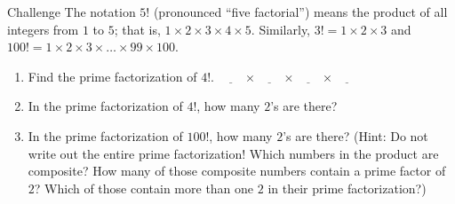 \documentclass[12pt,letterpaper]{article}
\begin{document}
\begin{problem}{Challenge}
The notation $5!$ (pronounced ``five factorial'') means
the product of all integers from $1$ to $5$; that is,
$1 \times 2 \times 3 \times 4 \times 5$. Similarly,
$3! = 1 \times 2 \times 3$ and $100! = 1 \times 2 \times
3 \times\ldots\times 99 \times 100$.

\begin{enumerate}
 \item Find the prime factorization of $4!$. \hfill
 $\underline{\hspace{2em}} \times
  \underline{\hspace{2em}} \times \underline{\hspace{2em}}
  \times \underline{\hspace{2em}}$
 \item In the prime factorization of $4!$, how many $2$'s are there?
 \item In the prime factorization of $100!$, how many $2$'s are there?
 (Hint: Do not write out the entire prime factorization! Which numbers in
 the product are composite? How many of those composite numbers contain a prime
 factor of $2$? Which of those contain more than one $2$ in their prime
 factorization?)
\end{enumerate}

\end{problem}
\end{document}
